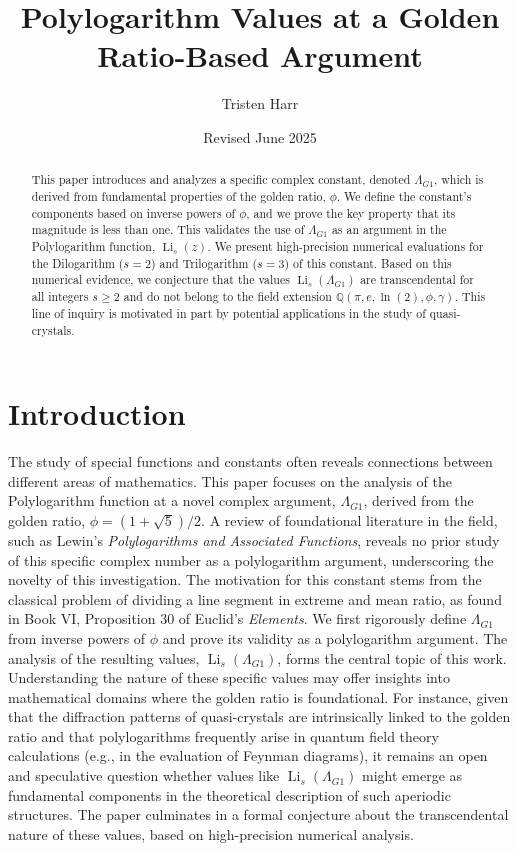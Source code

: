 \documentclass{amsart}
\theoremstyle{plain}
\theoremstyle{definition}
\theoremstyle{remark}
\DeclareMathOperator{\Li}{Li} %
\newcommand{\LambdaG}{\Lambda_{G1}}
\newcommand{\phiG}{\phi}
\begin{document}
\title[Polylogarithms at a Golden Ratio Argument]{Polylogarithm Values at a Golden Ratio-Based Argument}
\author{Tristen Harr}
\date{Revised June 2025}

\begin{abstract}
This paper introduces and analyzes a specific complex constant, denoted $\LambdaG$, which is derived from fundamental properties of the golden ratio, $\phiG$. We define the constant's components based on inverse powers of $\phiG$, and we prove the key property that its magnitude is less than one. This validates the use of $\LambdaG$ as an argument in the Polylogarithm function, $\Li_s(z)$. We present high-precision numerical evaluations for the Dilogarithm ($s=2$) and Trilogarithm ($s=3$) of this constant. Based on this numerical evidence, we conjecture that the values $\Li_s(\LambdaG)$ are transcendental for all integers $s \ge 2$ and do not belong to the field extension $\mathbb{Q}(\pi, e, \ln(2), \phiG, \gamma)$. This line of inquiry is motivated in part by potential applications in the study of quasi-crystals.
\end{abstract}

\maketitle

\section{Introduction}
The study of special functions and constants often reveals connections between different areas of mathematics. This paper focuses on the analysis of the Polylogarithm function at a novel complex argument, $\LambdaG$, derived from the golden ratio, $\phiG = (1+\sqrt{5})/2$. A review of foundational literature in the field, such as Lewin's \textit{Polylogarithms and Associated Functions}, reveals no prior study of this specific complex number as a polylogarithm argument, underscoring the novelty of this investigation. The motivation for this constant stems from the classical problem of dividing a line segment in extreme and mean ratio, as found in Book VI, Proposition 30 of Euclid's \textit{Elements}. We first rigorously define $\LambdaG$ from inverse powers of $\phiG$ and prove its validity as a polylogarithm argument. The analysis of the resulting values, $\Li_s(\LambdaG)$, forms the central topic of this work. Understanding the nature of these specific values may offer insights into mathematical domains where the golden ratio is foundational. For instance, given that the diffraction patterns of quasi-crystals are intrinsically linked to the golden ratio and that polylogarithms frequently arise in quantum field theory calculations (e.g., in the evaluation of Feynman diagrams), it remains an open and speculative question whether values like $\Li_s(\LambdaG)$ might emerge as fundamental components in the theoretical description of such aperiodic structures. The paper culminates in a formal conjecture about the transcendental nature of these values, based on high-precision numerical analysis.
\end{document}
